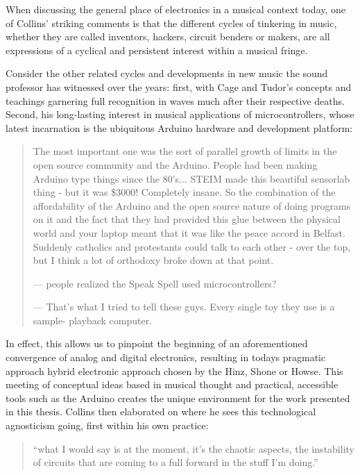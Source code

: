 When discussing the general place of electronics in a musical context today, one of Collins' striking comments is that the different cycles of tinkering in music, whether they are called inventors, hackers, circuit benders or makers, are all expressions of a cyclical and persistent interest within a musical fringe. 

Consider the other related cycles and developments in new music the sound professor has witnessed over the years: first, with Cage and Tudor's concepts and teachings garnering full recognition in waves much after their respective deaths. Second, his long-lasting interest in musical applications of microcontrollers, whose latest incarnation is the ubiquitous Arduino hardware and development platform: 

\begin{quote}
	The most important one was the sort of parallel growth of limits in the open source community and the Arduino. People had been making Arduino type things since the 80’s... STEIM made this beautiful sensorlab thing - but it was \$3000! Completely insane. So the combination of the affordability of the Arduino and the open source nature of doing programs on it and the fact that they had provided this glue between the physical world and your laptop meant that it was like the peace accord in Belfast. Suddenly catholics and protestants could talk to each other - over the top, but I think a lot of orthodoxy broke down at that point.
	
	— people realized the Speak Spell used microcontrollers? 
	
	— That’s what I tried to tell these guys. Every single toy they use is a sample- playback computer.
\end{quote} 

In effect, this allows us to pinpoint the beginning of an aforementioned convergence of analog and digital electronics, resulting in todays pragmatic approach hybrid electronic approach chosen by the Hinz, Shone or Howse. This meeting of conceptual ideas based in musical thought and practical, accessible tools such as the Arduino creates the unique environment for the work presented in this thesis. Collins then elaborated on where he sees this technological agnosticism going, first within his own practice: 

\begin{quote}
	``what I would say is at the moment, it’s the chaotic aspects, the instability of circuits that are coming to a full forward in the stuff I’m doing.''
	
	\end{quote}
		
